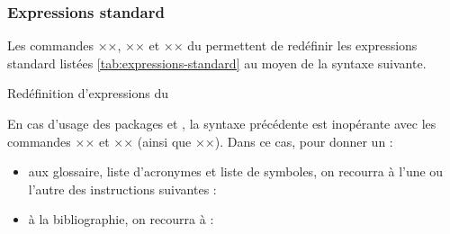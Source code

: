 \subsubsection{Expressions standard}
\label{sec:expressions-standard}

Les commandes ×\addto×, ×\captionsfrench× et ×\captionsenglish× du
 permettent de redéfinir les expressions standard listées
\vref{tab:expressions-standard} au moyen de la syntaxe suivante.
\begin{preamblecode}[title=Par exemple dans le \File{\configurationfile}]
\addto{}
\addto{}
\end{preamblecode}
\begin{table}[hb]
  \centering
  
  \caption{Valeurs et commandes d'expressions standard du }
  \label{tab:expressions-standard}
\end{table}
\begin{dbexample}{Redéfinition d'expressions du }{}
\begin{preamblecode}[title=Par exemple dans le \File{\configurationfile}]
\addto{}
\addto{}
\end{preamblecode}
\end{dbexample}

En cas d'usage des packages  et , la
syntaxe précédente est inopérante avec les commandes ×\glossaryname× et
×\bibname× (ainsi que ×\refname×). Dans ce cas, pour donner un  :
\begin{itemize}
\item aux glossaire, liste d'acronymes et liste de symboles, on recourra
  à l'une ou l'autre des instructions suivantes :
\begin{bodycode}
\printglossary[title=÷\meta{titre alternatif}÷]
\printglossaries[title=÷\meta{titre alternatif}÷]
\printacronyms[title=÷\meta{titre alternatif}÷]
\printsymbols[title=÷\meta{titre alternatif}÷]
\end{bodycode}
\item à la bibliographie, on recourra à :
\begin{bodycode}
\printbibliography[title=÷\meta{titre alternatif}÷]
\end{bodycode}
\end{itemize}

